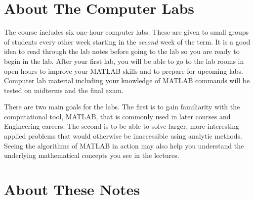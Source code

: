 \section{About The Computer Labs}

The course includes six one-hour computer labs. These are given to
small groups of students every other week starting in the {\em second}
week of the term. It is a good idea
to read through the lab notes before going to the lab so you are ready
to begin in the lab. After your first lab, you will be able to go to
the lab rooms in open hours to improve your MATLAB skills and to
prepare for upcoming labs. Computer lab material including your knowledge
of MATLAB commands will be tested on midterms and the final exam. 

There are two main goals for the labs. The first is to gain
familiarity with the computational tool, MATLAB, that is commonly used
in later courses and Engineering careers. The second is to be able to
solve larger, more interesting applied problems that would otherwise
be inaccessible using analytic methods. Seeing the algorithms of
MATLAB in action may also help you understand the underlying
mathematical concepts you see in the lectures.

\section{About These Notes}


